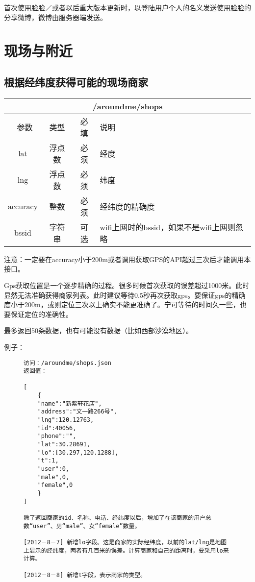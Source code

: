 \documentclass[cs4size]{ctexartutf8}
\begin{document}
首次使用脸脸／或者以后重大版本更新时，以登陆用户个人的名义发送使用脸脸的分享微博，微博由服务器端发送。


\section{现场与附近}

\subsection{根据经纬度获得可能的现场商家}

\begin{table}[H]
   \begin{center}
\begin{tabular}{|c|c|c|p{12cm}|}
\hline
\multicolumn{4}{|c|}{/aroundme/shops} \\
\hline\hline
 \  参数  & 类型 & 必填 &  说明  \\
\hline
 lat  & 浮点数 & 必须 & 经度\\
\hline
 lng  &  浮点数 & 必须 & 纬度\\ 
\hline
 accuracy  & 整数 & 必须 & 经纬度的精确度\\ 
\hline
 bssid  & 字符串 & 可选 & wifi上网时的bssid，如果不是wifi上网则忽略\\  
\hline
\end{tabular}
   \end{center}
\end{table}

注意：一定要在accuracy小于200m或者调用获取GPS的API超过三次后才能调用本接口。

Gps获取位置是一个逐步精确的过程。很多时候首次获取的误差超过1000米。此时显然无法准确获得商家列表。此时建议等待0.5秒再次获取gps。要保证gps的精确度小于200m，或则定位三次以上确实不能更准确了。宁可等待的时间久一些，也要保证定位的准确性。

最多返回50条数据，也有可能没有数据（比如西部沙漠地区）。

例子：

\begin{figure}[H]
\begin{verbatim}
访问：/aroundme/shops.json
返回值：

[
	{
	"name":"新紫轩花店",
	"address":"文一路266号",
	"lng":120.12763,
	"id":40056,
	"phone":"",
	"lat":30.28691,
	"lo":[30.297,120.1288],
	"t":1,
	"user":0,
	"male",0,
	"female",0
	}
]

除了返回商家的id、名称、电话、经纬度以后，增加了在该商家的用户总数“user”、男“male”、女“female”数量。

[2012－8－7] 新增lo字段。这是商家的实际经纬度，以前的lat/lng是地图上显示的经纬度，两者有几百米的误差。计算商家和自己的距离时，要采用lo来计算。

[2012－8－8] 新增t字段，表示商家的类型。

\end{verbatim}
\end{figure}
\end{document}
